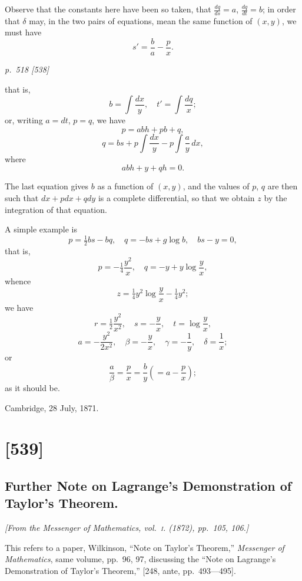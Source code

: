 \documentclass[11pt,a4paper]{book}
\begin{document}
Observe that the constants here have been so taken, that $\frac{dq}{ds} = a$, $\frac{dq}{dt} = b$; in order that $\delta$ may, in the two pairs of equations, mean the same function of $(x, y)$, we must have
\[
s' = \frac{b}{a} - \frac{p}{x}.
\]

\clearpage

\bigskip
\textit{p.~518 [538]}
\smallskip

that is,
\[
b = \int \frac{dx}{y}, \quad t' = \int \frac{dq}{x};
\]
or, writing $a = dt$, $p = q$, we have
\[
p = abh + pb + q,
\]
\[
q = bs + p \int \frac{dx}{y} - p \int \frac{a}{y} \, dx,
\]
where
\[
abh + y + qh = 0.
\]

The last equation gives $b$ as a function of $(x, y)$, and the values of $p$, $q$ are then such that $dx + pdx + qdy$ is a complete differential, so that we obtain $z$ by the integration of that equation.

A simple example is
\[
p = \tfrac{1}{2} bs - bq, \quad q = -bs + g \log b, \quad bs - y = 0,
\]
that is,
\[
p = -\tfrac{1}{4} \frac{y^2}{x}, \quad q = -y + y \log \frac{y}{x},
\]
whence
\[
z = \tfrac{1}{4} y^2 \log \frac{y}{x} - \tfrac{1}{4} y^2;
\]
we have
\[
r = \tfrac{1}{2} \frac{y^2}{x^2}, \quad s = -\frac{y}{x}, \quad t = \log \frac{y}{x},
\]
\[
a = -\frac{y^2}{2x^2}, \quad \beta = -\frac{y}{x}, \quad \gamma = -\frac{1}{y}, \quad \delta = \frac{1}{x};
\]
or
\[
\frac{a}{\beta} = \frac{p}{x} = \frac{b}{y} \left( = a - \frac{p}{x} \right);
\]
as it should be.

Cambridge, 28 July, 1871.

\clearpage

\section{[539]}
\subsection{Further Note on Lagrange's Demonstration of Taylor's Theorem.}

\begin{center}
\textit{[From the Messenger of Mathematics, vol.~\textsc{i}. (1872), pp.~105, 106.]}
\end{center}

This refers to a paper, Wilkinson, ``Note on Taylor's Theorem,'' \textit{Messenger of Mathematics}, same volume, pp.~96, 97, discussing the ``Note on Lagrange's Demonstration of Taylor's Theorem,'' [248, ante, pp.~493---495].
\end{document}
